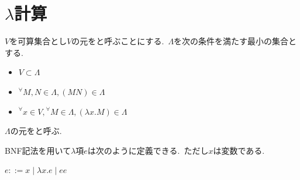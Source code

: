
\section{$\lambda$計算}

\begin{definition}
$V$を可算集合とし$V$の元をと呼ぶことにする.\
$\Lambda$を次の条件を満たす最小の集合とする.
\begin{itemize}
    \item $V \subset \Lambda$
    \item ${^{\forall}}M, N \in \Lambda, (M N) \in \Lambda$
    \item ${^{\forall}}x \in V, {^{\forall}}M \in \Lambda, (\lambda x.M) \in \Lambda$
\end{itemize}
$\Lambda$の元をと呼ぶ.
\end{definition}

BNF記法を用いて$\lambda$項$e$は次のように定義できる.\
ただし$x$は変数である.
\begin{center}
$e ::= x \mid \lambda x. e \mid e e$
\end{center}


